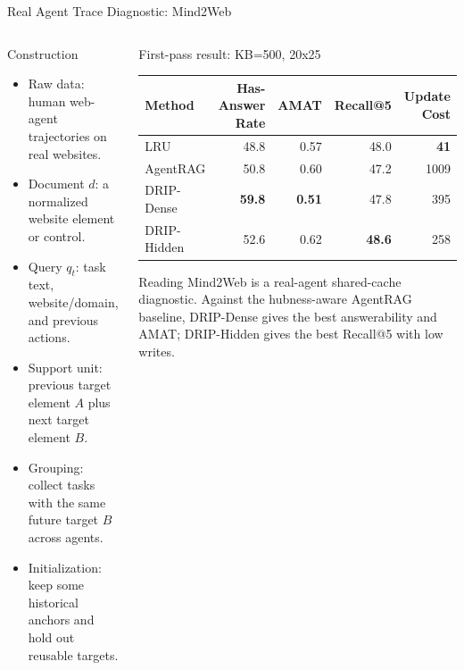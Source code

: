 \documentclass[aspectratio=169,10pt]{beamer}
\newcommand{\en}[1]{{\latinfont #1}}
\newcommand{\dive}{\en{DRIP}}
\newcommand{\lru}{\en{LRU}}
\begin{document}
\begin{frame}{Real Agent Trace Diagnostic: Mind2Web}
  \scriptsize
  \begin{columns}[T]
    \begin{column}{0.50\textwidth}
      \begin{block}{Construction}
        \begin{itemize}
          \setlength\itemsep{0.25em}
          \item Raw data: human web-agent trajectories on real websites.
          \item Document $d$: a normalized website element or control.
          \item Query $q_t$: task text, website/domain, and previous actions.
          \item Support unit: previous target element $A$ plus next target element $B$.
          \item Grouping: collect tasks with the same future target $B$ across agents.
          \item Initialization: keep some historical anchors and hold out reusable targets.
        \end{itemize}
      \end{block}
    \end{column}

    \begin{column}{0.47\textwidth}
      \begin{block}{First-pass result: KB=500, 20x25}
        \centering
        \scriptsize
        \renewcommand{\arraystretch}{1.06}
        \setlength{\tabcolsep}{2.0pt}
        \begin{tabular}{lrrrr}
          \toprule
          Method & \shortstack{\en{Has-Answer}\\\en{Rate}} & \en{AMAT} & \en{Recall@5} & \shortstack{\en{Update}\\\en{Cost}} \\
          \midrule
          \lru{} & 48.8 & 0.57 & 48.0 & \textbf{41} \\
          \en{AgentRAG} & 50.8 & 0.60 & 47.2 & 1009 \\
          \dive{}-\en{Dense} & \textbf{59.8} & \textbf{0.51} & 47.8 & 395 \\
          \dive{}-\en{Hidden} & 52.6 & 0.62 & \textbf{48.6} & 258 \\
          \bottomrule
        \end{tabular}
      \end{block}
      \begin{alertblock}{Reading}
        Mind2Web is a real-agent shared-cache diagnostic. Against the hubness-aware
        \en{AgentRAG} baseline, \dive{}-\en{Dense} gives the best answerability
        and \en{AMAT}; \dive{}-\en{Hidden} gives the best \en{Recall@5} with low writes.
      \end{alertblock}
    \end{column}
  \end{columns}
\end{frame}
\end{document}
